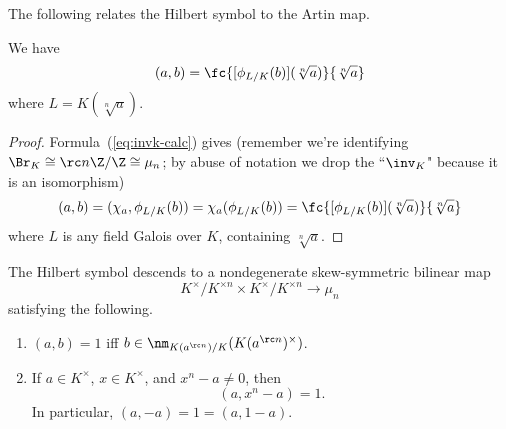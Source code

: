 The following relates the Hilbert symbol to the Artin map.
\begin{pr}
We have
\[
(a,b)=\fc{[\phi_{L/K}(b)](\sqrt[n]{a})}{\sqrt[n]a}
\]
where $L=K(\sqrt[n]a)$.
\end{pr}
\begin{proof}
Formula~(\ref{eq:invk-calc}) gives (remember we're identifying $ \Br_K\cong\rc n\Z/\Z\cong \mu_n$; by abuse of notation we drop the ``$\inv_K$" because it is an isomorphism)
\[
(a,b)=(\chi_a,\phi_{L/K}(b))=\chi_a(\phi_{L/K}(b))=\fc{[\phi_{L/K}(b)](\sqrt[n]{a})}{\sqrt[n]a}
\]
where $L$ is any field Galois over $K$, containing $\sqrt[n]a$.
\end{proof}
\begin{thm}
The Hilbert symbol descends to a nondegenerate skew-symmetric bilinear map
\[
K^{\times}/K^{\times n}\times K^{\times}/K^{\times n}\to \mu_n
\]
satisfying the following.
\begin{enumerate}
\item 
$(a,b)=1$ iff $b\in \nm_{K(a^{\rc n})/K}(K(a^{\rc n})^{\times})$.
\item
If $a\in K^{\times}$, $x\in K^{\times}$, and $x^n-a\ne 0$, then \[(a,x^n-a)=1.\] In particular, 
$(a,-a)=1=(a,1-a)$.
\end{enumerate}
\end{thm}
